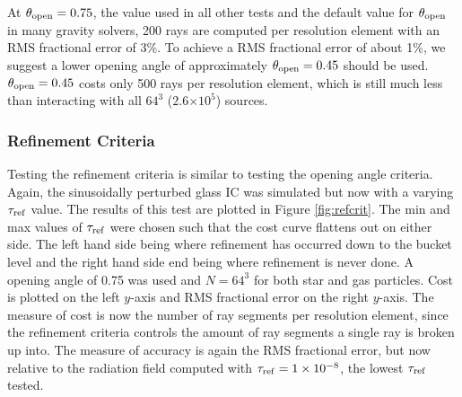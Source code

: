 \documentclass[fleq,usenatbib]{mnras}
\providecommand{\e}[1]{\ensuremath{\times10^{#1}}}
\newcommand{\tr}{\tau_{\rm ref}}
\newcommand{\tO}{\theta_{\rm open}}
\begin{document}
At $\tO=0.75$, the value used in all other tests and the 
default value for $\tO$ in many gravity solvers, 200 rays are 
computed per resolution element with an RMS fractional error of 3\%. To 
achieve a RMS fractional error of about 1\%, we suggest a lower opening angle 
of approximately $\tO=0.45$ should be used. $\tO=0.45$ costs only 500 rays per 
resolution element, which is still much less than interacting with all $64^3$ 
($2.6\e{5}$) sources.

\subsubsection{Refinement Criteria}
Testing the refinement criteria is similar to testing the opening angle 
criteria. Again, the sinusoidally perturbed glass IC was simulated but now 
with a varying $\tr$ value. The results of this test are plotted in Figure 
\ref{fig:refcrit}. The min and max values of $\tr$ were chosen such that the 
cost curve flattens out on either side. The left hand side being where 
refinement has occurred down to the bucket level and the right hand side 
end being where refinement is never done. A opening angle of 0.75 was used and 
$N=64^3$ for both star and gas particles. Cost is plotted on the left $y$-axis 
and RMS fractional error on the right $y$-axis. The measure of cost is now 
the number of ray segments per resolution element, since the refinement 
criteria controls the amount of ray segments a single ray is broken up into. 
The measure of accuracy is again the RMS fractional error, but now relative to 
the radiation field computed with $\tr=1\e{-8}$, the lowest $\tr$ tested.
\end{document}
